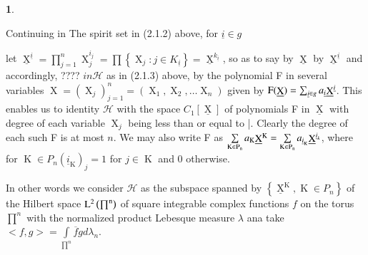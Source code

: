 \documentclass[a4paper,12pt]{article}
\DeclareMathOperator{\x}{\mathrm{X}}
\DeclareMathOperator{\ka}{\mathrm{K}}
\theoremstyle{definition}
\theoremstyle{underlinethm}
\theoremstyle{underline}
\newtheorem{subsubsec}{}[subsection]
\begin{document}
\begin{subsubsec}\label{subsubsection-2.1.4}

Continuing in The spirit set in (2.1.2) above, for $\underline{i} \in g$ 

\noindent
let $\underline{\x}^{\underline{i}} = \prod\limits_{j=1}^{n} \x_{j}^{i_{j}} = \prod \left\{ \x_{j} : j \in K_{\underline{i}} \right\} = \underline{\x}^{k_{\underline{i}}}$, so as to say by $\underline{\x}$ by $\underline{\x}^{\underline{i}}$ and accordingly, ???? $ in \mathcal{H}$ as in (2.1.3) above, by the polynomial F in several variables $\x = (\x_{j})^{n}_{j=1} = (\x_{1}, \x_{2}, \ldots \x_{n})$ given by ${\rm F} (\underline{\x}) = \sum_{\underline{i}\in g} a_{\underline{i}} \underline{\x}^{\underline{i}}$. This enables us to identity $\mathcal{H}$ with the space $C_{1}[\underline{\x}]$ of polynomials F in $\underline{\x}$ with degree of each variable $\x_{j}$ being less than or equal to |. Clearly the degree of each such F is at most $n$. We may also write F as $\sum\limits_{\rm K \in P_{n}} a_{\rm K} \underline{\x}^{\ka} = \sum\limits_{\rm K \in P_{n}} a_{\underline{i}_{\ka}} \underline{\x}^{\underline{i}_{k}}$, where for $\ka \in P_{n} (\underline{i}_{\ka})_{j} =1$ for $j\in \ka $ and $0$ otherwise.

In other words we consider $\mathcal{H}$ as the subspace spanned by $\left\{ \underline{\x}^{\ka}, \ka \in P_{n}\right\}$ of the Hilbert space $\rm L^{2} \left(\prod^{n}\right)$ of square integrable complex functions $f$ on the torus $\prod^{n}$ with the normalized product Lebesque measure $\lambda$ ana take $<f, g> = \int\limits_{\prod^{n}} \overline{f} g d \lambda_{n}$.
 
 \end{subsubsec}
 
\end{document}
